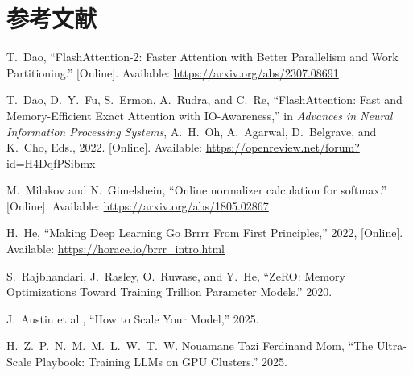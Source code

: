 \section*{参考文献}

\begin{enumerate}[label={[\arabic*]}]
  \item T.~Dao, “FlashAttention-2: Faster Attention with Better Parallelism and Work Partitioning.” [Online]. Available: \url{https://arxiv.org/abs/2307.08691}
  \item T.~Dao, D.~Y.~Fu, S.~Ermon, A.~Rudra, and C.~Re, “FlashAttention: Fast and Memory-Efficient Exact Attention with IO-Awareness,” in \textit{Advances in Neural Information Processing Systems}, A.~H.~Oh, A.~Agarwal, D.~Belgrave, and K.~Cho, Eds., 2022. [Online]. Available: \url{https://openreview.net/forum?id=H4DqfPSibmx}
  \item M.~Milakov and N.~Gimelshein, “Online normalizer calculation for softmax.” [Online]. Available: \url{https://arxiv.org/abs/1805.02867}
  \item H.~He, “Making Deep Learning Go Brrrr From First Principles,” 2022, [Online]. Available: \url{https://horace.io/brrr_intro.html}
  \item S.~Rajbhandari, J.~Rasley, O.~Ruwase, and Y.~He, “ZeRO: Memory Optimizations Toward Training Trillion Parameter Models.” 2020.
  \item J.~Austin et al., “How to Scale Your Model,” 2025.
  \item H.~Z.~P.~N.~M.~M.~L.~W.~T.~W. Nouamane Tazi Ferdinand Mom, “The Ultra-Scale Playbook: Training LLMs on GPU Clusters.” 2025.
\end{enumerate}
